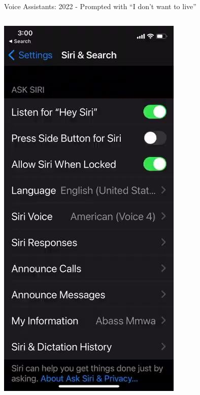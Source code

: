 \documentclass[nobackground,dvipsnames,table,aspectratio=169]{beamer}
\begin{document}
\begin{frame}{Voice Assistants: 2022 - Prompted with “I don’t want to live”}%
    \begin{columns}
            \href{}{\includegraphics[width=\textwidth]{2022-response-siri}}

\end{columns}
\end{frame}
\end{document}
